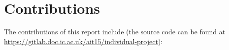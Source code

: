 






\section{Contributions}

The contributions of this report include (the source code can be found at \url{https://gitlab.doc.ic.ac.uk/ait15/individual-project}): 

